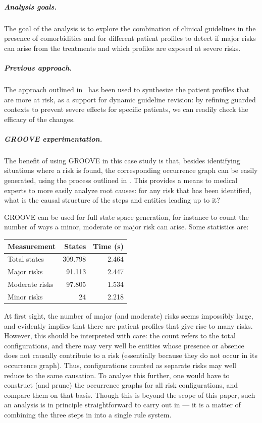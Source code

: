 \subparagraph*{Analysis goals.}
The goal of the analysis is to explore the combination of clinical guidelines in the presence of comorbidities and for different patient profiles to detect if major risks can arise from the treatments and which profiles are exposed at severe risks.

\subparagraph*{Previous approach.}
The approach outlined in~\cite{DBLP:conf/cmsb/BowlesBBFGM24} has been used to synthesize the patient profiles that are more at risk, as a support for dynamic guideline revision: by refining guarded contexts to prevent severe effects for specific patients, we can readily check the efficacy of the changes.

\subparagraph*{GROOVE experimentation.}

The benefit of using GROOVE in this case study is that, besides identifying situations where a risk is found, the corresponding occurrence graph can be easily generated, using the process outlined in . This provides a means to medical experts to more easily analyze root causes: for any risk that has been identified, what is the causal structure of the steps and entities leading up to it?

GROOVE can be used for full state space generation, for instance to count the number of ways a minor, moderate or major risk can arise. Some statistics are:

\begin{center}
\begin{tabular}{lrr}
\bf Measurement & \bf States & \bf Time (s) \\
\hline
Total states   & 309.798 & 2.464 \\
Major risks    &  91.113 & 2.447 \\
Moderate risks &  97.805 & 1.534 \\
Minor risks    &      24 & 2.218
\end{tabular}
\end{center}

At first sight, the number of major (and moderate) risks seems impossibly large, and evidently implies that there are patient profiles that give rise to many risks. However, this should be interpreted with care: the count refers to the total configurations, and there may very well be entities whose presence or absence does not causally contribute to a risk (essentially because they do not occur in its occurrence graph). Thus, configurations counted as separate risks may well reduce to the same causation. To analyse this further, one would have to construct (and prune) the occurrence graphs for all risk configurations, and compare them on that basis. Though this is beyond the scope of this paper, such an analysis is in principle straightforward to carry out in \GROOVE --- it is a matter of combining the three steps in  into a single rule system.
 
